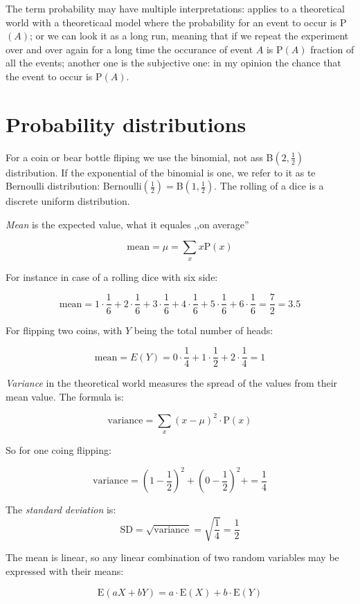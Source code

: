 The term probability may have multiple interpretations: applies to a theoretical
world with a theoreticaal model where the probability for an event to occur is
P$(A)$; or we can look it as a long run, meaning that if we repeat the
experiment over and over again for a long time the occurance of event $A$ is
P$(A)$ fraction of all the events; another one is the subjective one: in my
opinion the chance that the event to occur is P$(A)$.

\section{Probability distributions}

For a coin or bear bottle fliping we use the binomial, not ass
B$(2,\frac{1}{2})$  distribution. If the exponential of the binomial is
one, we refer to it as te Bernoulli distribution: Bernoulli$(\frac{1}{2}) =
$B$(1, \frac{1}{2})$. The rolling of a dice is a discrete uniform
distribution.

\emph{Mean} is the expected value, what it equales ,,on average'' 

\[ \mbox{mean} = \mu = \sum_{x}x\mbox{P}(x)
\]

For instance in case of a rolling dice with six side:

\[
\mbox{mean} =
1\cdot\frac{1}{6}+2\cdot\frac{1}{6}+3\cdot\frac{1}{6}+4\cdot\frac{1}{6}+5\cdot\frac{1}{6}+6\cdot\frac{1}{6}=\frac{7}{2}=3.5
\]

For flipping two coins, with $Y$ being the total number of heads: 

\[
\mbox{mean}=E(Y)= 0\cdot\frac{1}{4}+1\cdot\frac{1}{2}+2\cdot\frac{1}{4} = 1
\]

\emph{Variance} in the theoretical world measures the spread of the values from
their mean value. The formula is:

\[
\mbox{variance} = \sum_{x} (x-\mu)^2\cdot\mbox{P}(x) 
\]

So for one coing flipping:

\[ \mbox{variance} =  \left(1-\frac{1}{2}\right)^2 +
\left(0-\frac{1}{2}\right)^2 + =  \frac{1}{4} \]

The \emph{standard deviation} is: 
\[ \mbox{SD} = \sqrt{\mbox{variance}} = \sqrt{\frac{1}{4}} = \frac{1}{2}
\]

The mean is linear, so any linear combination of two random variables may be
expressed with their means:

\[ \mbox{E}(aX+bY) = a\cdot\mbox{E}(X) + b\cdot\mbox{E}(Y)\]

